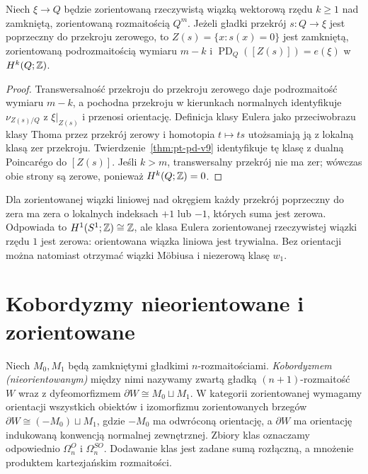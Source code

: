 \begin{wniosek}
\label{cor:euler-zero-v9}
Niech $\xi\to Q$ będzie zorientowaną rzeczywistą wiązką
wektorową rzędu $k\ge1$ nad zamkniętą, zorientowaną
rozmaitością $Q^m$. Jeżeli gładki przekrój
$s:Q\to\xi$ jest poprzeczny do przekroju zerowego,
to $Z(s)=\{x:s(x)=0\}$ jest zamkniętą, zorientowaną
podrozmaitością wymiaru $m-k$ i
$\operatorname{PD}_Q([Z(s)])=e(\xi)$ w $H^k(Q;\mathbb{Z})$.
\end{wniosek}
\begin{proof}
Transwersalność przekroju do przekroju zerowego
daje podrozmaitość wymiaru $m-k$, a pochodna przekroju
w kierunkach normalnych identyfikuje
$\nu_{Z(s)/Q}$ z $\xi|_{Z(s)}$ i przenosi orientację.
Definicja klasy Eulera jako przeciwobrazu klasy Thoma
przez przekrój zerowy i homotopia $t\mapsto t s$
utożsamiają ją z lokalną klasą zer przekroju.
Twierdzenie~\ref{thm:pt-pd-v9} identyfikuje tę klasę
z dualną Poincarégo do $[Z(s)]$. Jeśli $k>m$,
transwersalny przekrój nie ma zer; wówczas obie strony
są zerowe, ponieważ $H^k(Q;\mathbb{Z})=0$.
\end{proof}

\begin{przyklad}
Dla zorientowanej wiązki liniowej nad okręgiem
każdy przekrój poprzeczny do zera ma zera o
lokalnych indeksach $+1$ lub $-1$, których suma
jest zerowa. Odpowiada to $H^1(S^1;\mathbb{Z})\cong\mathbb{Z}$,
ale klasa Eulera zorientowanej rzeczywistej wiązki
rzędu $1$ jest zerowa: orientowana wiązka liniowa
jest trywialna. Bez orientacji można natomiast otrzymać
wiązki Möbiusa i niezerową klasę $w_1$.
\end{przyklad}

\section{Kobordyzmy nieorientowane i zorientowane}
\begin{definicja}
Niech $M_0,M_1$ będą zamkniętymi gładkimi
$n$-rozmaitościami. \emph{Kobordyzmem (nieorientowanym)}
między nimi nazywamy zwartą gładką
$(n+1)$-rozmaitość $W$ wraz z dyfeomorfizmem
$\partial W\cong M_0\sqcup M_1$.
W kategorii zorientowanej wymagamy orientacji wszystkich
obiektów i izomorfizmu zorientowanych brzegów
$\partial W\cong (-M_0)\sqcup M_1$, gdzie
$-M_0$ ma odwróconą orientację, a $\partial W$ ma
orientację indukowaną konwencją normalnej zewnętrznej.
Zbiory klas oznaczamy odpowiednio
$\Omega_n^O$ i $\Omega_n^{SO}$. Dodawanie klas
jest zadane sumą rozłączną, a mnożenie produktem
kartezjańskim rozmaitości.
\end{definicja}

